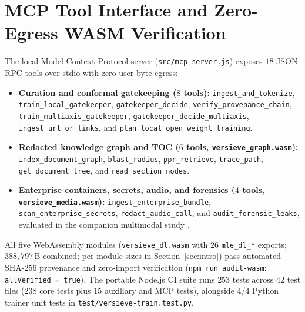 \documentclass{article}
\begin{document}



\newpage
\appendix
\section{MCP Tool Interface and Zero-Egress WASM Verification}
\label{sec:mcp}

The local Model Context Protocol server (\texttt{src/mcp-server.js}) exposes $18$ JSON-RPC tools over stdio with zero user-byte egress:
\begin{itemize}
    \item \textbf{Curation and conformal gatekeeping ($8$ tools):} \texttt{ingest\_and\_tokenize}, \texttt{train\_local\_gatekeeper}, \texttt{gatekeeper\_decide}, \texttt{verify\_provenance\_chain}, \texttt{train\_multiaxis\_gatekeeper}, \texttt{gatekeeper\_decide\_multiaxis}, \texttt{ingest\_url\_or\_links}, and \texttt{plan\_local\_open\_weight\_training}.
    \item \textbf{Redacted knowledge graph and TOC ($6$ tools, \texttt{versieve\_graph.wasm}):} \texttt{index\_document\_graph}, \texttt{blast\_radius}, \texttt{ppr\_retrieve}, \texttt{trace\_path}, \texttt{get\_document\_tree}, and \texttt{read\_section\_nodes}.
    \item \textbf{Enterprise containers, secrets, audio, and forensics ($4$ tools, \texttt{versieve\_media.wasm}):} \texttt{ingest\_enterprise\_bundle}, \texttt{scan\_enterprise\_secrets}, \texttt{redact\_audio\_call}, and \texttt{audit\_forensic\_leaks}, evaluated in the companion multimodal study \citep{ardiyansyah2026multimodal}.
\end{itemize}

All five WebAssembly modules (\texttt{versieve\_dl.wasm} with $26$ \texttt{mle\_dl\_*} exports; $388{,}797$\,B combined; per-module sizes in Section~\ref{sec:intro}) pass automated SHA-256 provenance and zero-import verification (\texttt{npm run audit-wasm}: \texttt{allVerified = true}). The portable Node.js CI suite runs $253$ tests across $42$ test files ($238$ core tests plus $15$ auxiliary and MCP tests), alongside $4/4$ Python trainer unit tests in \texttt{test/versieve-train.test.py}.
\end{document}
